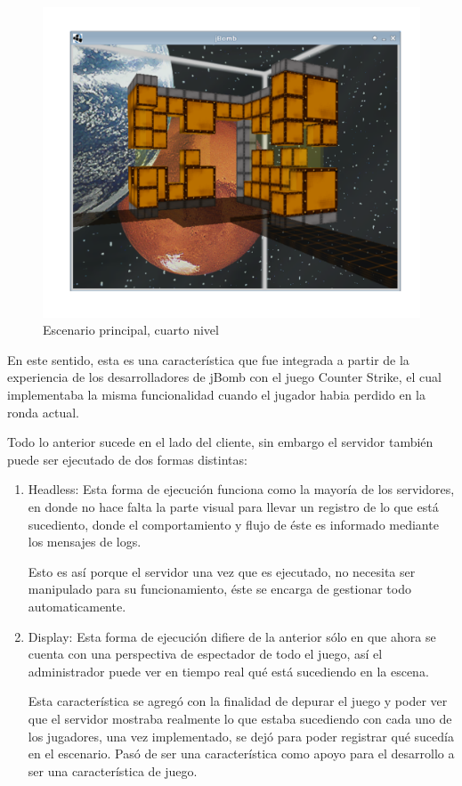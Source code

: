 \documentclass[a4paper,12pt,openany,oneside]{book}
\begin{document}
\begin{figure}
\begin{center}
\includegraphics[scale=.7]{img2.pdf}
\end{center}
\caption[Escenario principal, cuarto nivel]{Escenario principal, cuarto nivel}
\end{figure}

En este sentido, esta es una característica que fue integrada a partir de la experiencia de los desarrolladores de jBomb con el juego Counter Strike, el cual implementaba la misma funcionalidad cuando el jugador habia perdido en la ronda actual.

Todo lo anterior sucede en el lado del cliente, sin embargo el servidor también puede ser ejecutado de dos formas distintas:
\begin{enumerate}
\item Headless: Esta forma de ejecución funciona como la mayoría de los servidores, en donde no hace falta la parte visual para llevar un registro de lo que está sucediento, donde el comportamiento y flujo de éste es informado mediante los mensajes de logs. 

Esto es así porque el servidor una vez que es ejecutado, no necesita ser manipulado para su funcionamiento, éste se encarga de gestionar todo automaticamente.
\item Display: Esta forma de ejecución difiere de la anterior sólo en que ahora se cuenta con una perspectiva de espectador de todo el juego, así el administrador puede ver en tiempo real qué está sucediendo en la escena.

Esta característica se agregó con la finalidad de depurar el juego y poder ver que el servidor mostraba realmente lo que estaba sucediendo con cada uno de los jugadores, una vez implementado, se dejó para poder registrar qué sucedía en el escenario. Pasó de ser una característica como apoyo para el desarrollo a ser una característica de juego.
\end{enumerate}
\end{document}
